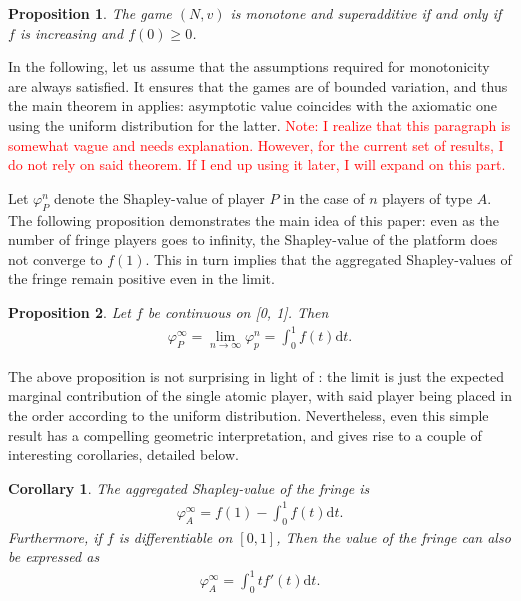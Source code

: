 \documentclass[a4paper]{article}
\newtheorem{proposition}{Proposition}
\newtheorem{corollary}{Corollary}
\newcommand{\dt}{\mathrm{d}t}
\begin{document}
\begin{proposition}
    \label{prop:monotone}
    The game $(N, v)$ is monotone and superadditive if and only if $f$ is increasing and $f(0) \geq 0$. %
\end{proposition}

In the following, let us assume that the assumptions required for monotonicity are always satisfied. It ensures that the games are of bounded variation, and thus the main theorem in \textcite{fogelman1980asymptotic} applies: asymptotic value coincides with the axiomatic one using the uniform distribution for the latter. \textcolor{red}{Note: I realize that this paragraph is somewhat vague and needs explanation. However, for the current set of results, I do not rely on said theorem. If I end up using it later, I will expand on this part.}

Let $\varphi_P^n$ denote the Shapley-value of player $P$ in the case of $n$ players of type $A$. The following proposition demonstrates the main idea of this paper: even as the number of fringe players goes to infinity, the Shapley-value of the platform does not converge to $f(1)$. This in turn implies that the aggregated Shapley-values of the fringe remain positive even in the limit.
\begin{proposition}
    \label{prop:one_sided}
    Let $f$ be continuous on [0, 1]. Then
    \begin{align*}
        \varphi_P^\infty = \lim_{n \to \infty} \varphi_p^n = \int_0^1 f(t) \dt .
    \end{align*}
\end{proposition}

The above proposition is not surprising in light of \textcite{fogelman1980asymptotic}: the limit is just the expected marginal contribution of the single atomic player, with said player being placed in the order according to the uniform distribution. Nevertheless, even this simple result has a compelling geometric interpretation, and gives rise to a couple of interesting corollaries, detailed below.

\begin{corollary}
    \label{cor:fringe_value}
    The aggregated Shapley-value of the fringe is
    \begin{align*}
        \varphi_A^\infty = f(1) - \int_0^1 f(t) \dt.
    \end{align*}
    Furthermore, if $f$ is differentiable on $[0, 1]$, Then the value of the fringe can also be expressed as
    \begin{align*}
        \varphi_A^\infty = \int_0^1 t f'(t) \dt.
    \end{align*}
\end{corollary}
\end{document}

